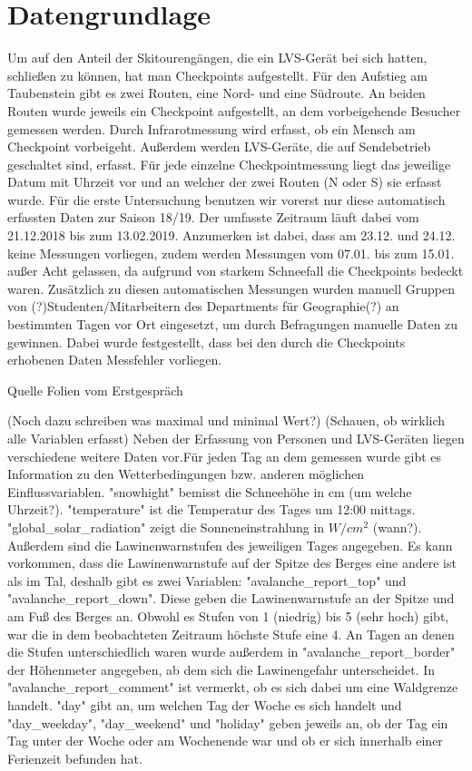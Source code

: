 \documentclass[11pt,a4paper]{report}
\begin{document}
\section{Datengrundlage}
Um auf den Anteil der Skitourengängen, die ein LVS-Gerät bei sich hatten, schließen zu können, hat man Checkpoints aufgestellt. Für den Aufstieg am Taubenstein gibt es zwei Routen, eine Nord- und eine Südroute. An beiden Routen wurde jeweils ein Checkpoint aufgestellt, an dem vorbeigehende Besucher gemessen werden. Durch Infrarotmessung wird erfasst, ob ein Mensch am Checkpoint vorbeigeht. Außerdem werden LVS-Geräte, die auf Sendebetrieb geschaltet sind, erfasst. Für jede einzelne Checkpointmessung liegt das jeweilige Datum mit Uhrzeit vor und an welcher der zwei Routen (N oder S) sie erfasst wurde.
Für die erste Untersuchung benutzen wir vorerst nur diese automatisch erfassten Daten zur Saison 18/19. Der umfasste Zeitraum läuft dabei vom 21.12.2018 bis zum 13.02.2019. Anzumerken ist dabei, dass am 23.12. und 24.12. keine Messungen vorliegen, zudem werden Messungen vom 07.01. bis zum 15.01. außer Acht gelassen, da aufgrund von starkem Schneefall die Checkpoints bedeckt waren.
Zusätzlich zu diesen automatischen Messungen wurden manuell Gruppen von (?)Studenten/Mitarbeitern des Departments für Geographie(?) an bestimmten Tagen vor Ort eingesetzt, um durch Befragungen manuelle Daten zu gewinnen. Dabei wurde festgestellt, dass bei den durch die Checkpoints erhobenen Daten Messfehler vorliegen.

Quelle
Folien vom Erstgespräch

(Noch dazu schreiben was maximal und minimal Wert?)
(Schauen, ob wirklich alle Variablen erfasst)
Neben der Erfassung von Personen und LVS-Geräten liegen verschiedene weitere Daten vor.Für jeden Tag an dem gemessen wurde gibt es Information zu den Wetterbedingungen bzw. anderen möglichen Einflussvariablen. "snowhight" bemisst die Schneehöhe in cm (um welche Uhrzeit?). "temperature" ist die Temperatur des Tages um 12:00 mittags. "global\_solar\_radiation" zeigt die Sonneneinstrahlung in $W/cm^2$ (wann?). Außerdem sind die Lawinenwarnstufen des jeweiligen Tages angegeben. Es kann vorkommen, dass die Lawinenwarnstufe auf der Spitze des Berges eine andere ist als im Tal, deshalb gibt es zwei Variablen: "avalanche\_report\_top" und "avalanche\_report\_down". Diese geben die Lawinenwarnstufe an der Spitze und am Fuß des Berges an. Obwohl es Stufen von 1 (niedrig) bis 5 (sehr hoch) gibt, war die in dem beobachteten Zeitraum höchste Stufe eine 4. An Tagen an denen die Stufen unterschiedlich waren wurde außerdem in "avalanche\_report\_border" der Höhenmeter angegeben, ab dem sich die Lawinengefahr unterscheidet. In "avalanche\_report\_comment" ist vermerkt, ob es sich dabei um eine Waldgrenze handelt. "day" gibt an, um welchen Tag der Woche es sich handelt und "day\_weekday", "day\_weekend" und "holiday" geben jeweils an, ob der Tag ein Tag unter der Woche oder am Wochenende war und ob er sich innerhalb einer Ferienzeit befunden hat.
\end{document}
